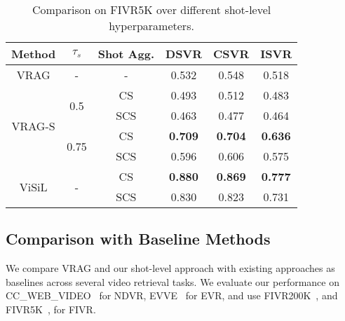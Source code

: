 \documentclass[letterpaper]{article} \usepackage{aaai22}  \usepackage{times}  \usepackage{helvet}  \usepackage{courier}  \usepackage[hyphens]{url}  \usepackage{graphicx} \urlstyle{rm} \usepackage{amsmath}
\begin{document}
\begin{table}[ht]
    \centering
    \begin{tabular}{|c|c|c|c|c|c|}
    \hline
         Method & $\tau_s$ & Shot Agg. & DSVR & CSVR & ISVR \\  
         \hline\hline
         VRAG & - & - & 0.532 & 0.548 & 0.518 \\
         \hline \hline
\multirow{4}{*}{VRAG-S} & \multirow{2}{*}{0.5} & CS & 0.493 & 0.512 & 0.483 \\
          \cline{3-6}
         && SCS & 0.463 & 0.477 & 0.464 \\
          \cline{2-6}
& \multirow{2}{*}{0.75} & CS & \textbf{0.709} & \textbf{0.704} & \textbf{0.636} \\
         \cline{3-6}
        & & SCS & 0.596 & 0.606 & 0.575 \\
         \hline \hline 
         \multirow{2}{*}{ViSiL} & \multirow{2}{*}{-} & CS & \textbf{0.880} & \textbf{0.869} & \textbf{0.777} \\
         \cline{3-6}
         & & SCS & 0.830 & 0.823 & 0.731 \\
         \hline \hline
    \end{tabular}
    \caption{Comparison on FIVR5K over different shot-level hyperparameters.}
    \label{tab:ablation:shot-level}
\end{table}

\subsection{Comparison with Baseline Methods}

We compare VRAG and our shot-level approach with existing approaches as baselines across several video retrieval tasks. We evaluate our performance on CC\_WEB\_VIDEO~\cite{dataset:cc-web-video} for NDVR, EVVE~\cite{dataset:evve} for EVR, and use FIVR200K~\cite{dataset:fivr200k}, and FIVR5K~\cite{kordopatiszilos2019visil, dataset:fivr200k}, for FIVR.
\vspace{0mm}
\end{document}
